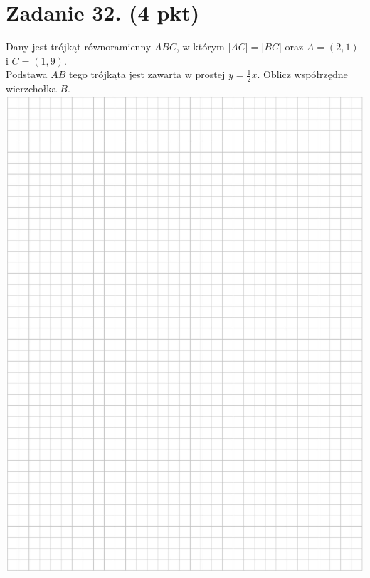 \documentclass[10pt]{article}
\begin{document}
\section*{Zadanie 32. (4 pkt)}
Dany jest trójkąt równoramienny \(A B C\), w którym \(|A C|=|B C|\) oraz \(A=(2,1)\) i \(C=(1,9)\).\\
Podstawa \(A B\) tego trójkąta jest zawarta w prostej \(y=\frac{1}{2} x\). Oblicz współrzędne wierzchołka \(B\).\\
\includegraphics[max width=\textwidth, center]{2024_11_21_6a8be49478f78d0689cfg-14}\\
\end{document}
